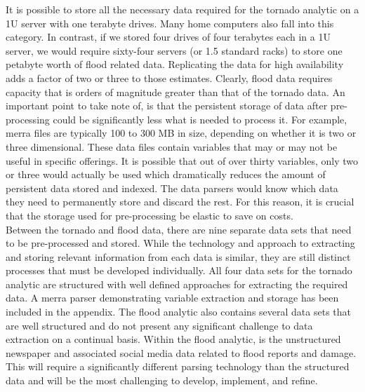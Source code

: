 It is possible to store  all the necessary data required for the tornado analytic on a 1U server with one terabyte drives. Many home computers also fall into this category. In contrast, if we stored four drives of four terabytes each in a 1U server, we would require sixty-four servers  (or 1.5 standard racks) to store one petabyte worth of flood related data. Replicating the data for high availability adds a factor of two or three to those estimates. Clearly, flood data requires capacity that is orders of magnitude greater than that of the tornado data. An important point to take note of, is that the persistent storage of data after pre-processing could be significantly less what is needed to process it. For example, \gls{merra} files are typically 100 to 300 MB in size, depending on whether it is two or three dimensional. These data files contain variables that may or may not be useful in specific offerings. It is possible that out of over thirty variables, only two or three would actually be used which dramatically reduces the amount of persistent data stored and indexed. The data parsers would know which data they need to permanently store and discard the rest. For this reason, it is crucial that the storage used for pre-processing be elastic to save on costs.\\

Between the tornado and flood data, there are nine separate data sets that need to be pre-processed and stored. While the technology and approach to extracting and storing relevant information from each data is similar, they are still distinct processes that must be developed individually. All four data sets for the tornado analytic are structured with well defined approaches for extracting the required data.  A \gls{merra} parser demonstrating variable extraction and storage has been included in the appendix.  The flood analytic also contains several data sets that are well structured and do not present any significant challenge to data extraction on a continual basis. Within the flood analytic, is the unstructured newspaper and associated social media data related to flood reports and damage. This will require a significantly different parsing technology than the structured data and will be the most challenging to develop, implement, and refine.\\

